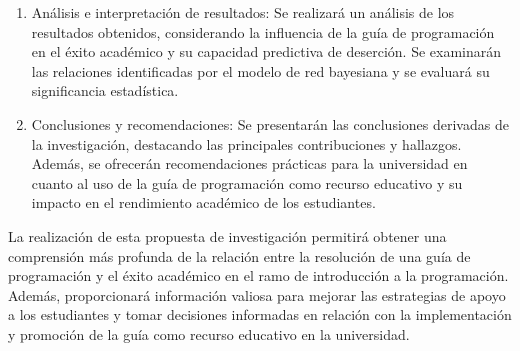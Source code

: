 \begin{enumerate}
    \item Análisis e interpretación de resultados: Se realizará un análisis de los resultados obtenidos, considerando la influencia de la guía de programación en el éxito académico y su capacidad predictiva de deserción. Se examinarán las relaciones identificadas por el modelo de red bayesiana y se evaluará su significancia estadística.

    \item Conclusiones y recomendaciones: Se presentarán las conclusiones derivadas de la investigación, destacando las principales contribuciones y hallazgos. Además, se ofrecerán recomendaciones prácticas para la universidad en cuanto al uso de la guía de programación como recurso educativo y su impacto en el rendimiento académico de los estudiantes.
\end{enumerate}
\vfill
La realización de esta propuesta de investigación permitirá obtener una comprensión más profunda de la relación entre la resolución de una guía de programación y el éxito académico en el ramo de introducción a la programación. Además, proporcionará información valiosa para mejorar las estrategias de apoyo a los estudiantes y tomar decisiones informadas en relación con la implementación y promoción de la guía como recurso educativo en la universidad.
\vfill